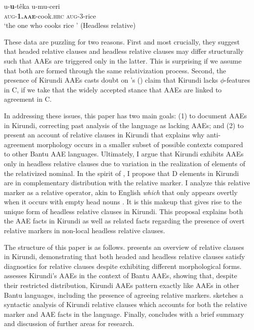 \documentclass[output=paper,colorlinks,citecolor=brown
]{langscibook}
\begin{document}
		\ea \label{ex:myers:HRC1}
  \gll	u-{\bfseries  u}-têka u-mu-ceri \\ 
		\textsc{aug}-\textsc{{\bfseries  1.aae}}-cook.\textsc{hrc} \textsc{aug}-3-rice\\
		\glt `the one who cooks rice '  \hfill{(Headless relative)}
		\z
 
These data are puzzling for two reasons. First and most crucially, they suggest that headed relative clauses and headless relative clauses may differ structurally such that AAEs are triggered only in the latter. This is surprising if we assume that both are formed through the same relativization process. Second, the presence of Kirundi AAEs casts doubt on \citeauthor{BHenderson:2013}'s (\citeyear{BHenderson:2013}) claim that Kirundi lacks $\phi$-features in C, if we take that the widely accepted stance that AAEs are linked to agreement in C.

In addressing these issues, this paper has two main goals: (1) to document AAEs in Kirundi, correcting past analysis of the language as lacking AAEs; and (2) to present an account of relative clauses in Kirundi that explains why anti-agreement morphology occurs in a smaller subset of possible contexts compared to other Bantu AAE languages. Ultimately, I argue that Kirundi exhibits AAEs only in headless relative clauses due to variation in the realization of elements of the relativized nominal. In the spirit of \citet{Jenksetal:2017}, I propose that D elements in Kirundi are in complementary distribution with the relative marker. I analyze this relative marker as a relative operator, akin to English \emph{which} that only appears overtly when it occurs with empty head nouns \citep{Panagiotidis:2003}. It is this makeup that gives rise to the unique form of headless relative clauses in Kirundi. This proposal explains both the AAE facts in Kirundi as well as related facts regarding the presence of overt relative markers in non-local headless relative clauses.

 The structure of this paper is as follows.  presents an overview of relative clauses in Kirundi, demonstrating that both headed and headless relative clauses satisfy diagnostics for relative clauses despite exhibiting different morphological forms.  assesses Kirundi's AAEs in the context of Bantu AAEs, showing that, despite their restricted distribution, Kirundi AAEs pattern exactly like AAEs in other Bantu languages, including the presence of agreeing relative markers.  sketches a syntactic analysis of Kirundi relative clauses which accounts for both the relative marker and AAE facts in the language. Finally,  concludes with a brief summary and discussion of further areas for research.
\end{document}
